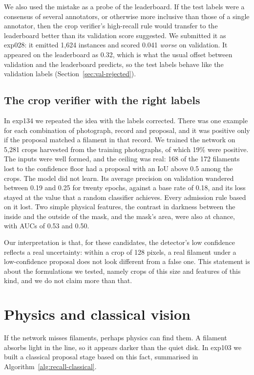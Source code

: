 We also used the mistake as a probe of the leaderboard. If the test labels were a consensus of several
annotators, or otherwise more inclusive than those of a single annotator, then the crop verifier's
high-recall rule would transfer to the leaderboard better than its validation score suggested. We
submitted it as exp028: it emitted 1,624 instances and scored 0.041 \emph{worse} on validation. It
appeared on the leaderboard as 0.32, which is what the usual offset between validation and the
leaderboard predicts, so the test labels behave like the validation labels
(Section~\ref{sec:val-rejected}).

\subsection{The crop verifier with the right labels}\label{sec:recall-crop-fixed}
In exp134 we repeated the idea with the labels corrected. There was one example for each combination
of photograph, record and proposal, and it was positive only if the proposal matched a filament in
that record. We trained the network on 5,281 crops harvested from the training photographs, of which
19\% were positive. The inputs were well formed, and the ceiling was real: 168 of the 172 filaments
lost to the confidence floor had a proposal with an IoU above 0.5 among the crops. The model did not
learn. Its average precision on validation wandered between 0.19 and 0.25 for twenty epochs, against a
base rate of 0.18, and its loss stayed at the value that a random classifier achieves. Every admission
rule based on it lost. Two simple physical features, the contrast in darkness between the inside and
the outside of the mask, and the mask's area, were also at chance, with AUCs of 0.53 and 0.50.

Our interpretation is that, for these candidates, the detector's low confidence reflects a real
uncertainty: within a crop of 128 pixels, a real filament under a low-confidence proposal does not
look different from a false one. This statement is about the formulations we tested, namely crops of
this size and features of this kind, and we do not claim more than that.

\section{Physics and classical vision}\label{sec:recall-physics}
If the network misses filaments, perhaps physics can find them. A filament absorbs light in the \Ha{}
line, so it appears darker than the quiet disk. In exp103 we built a classical proposal stage based on
this fact, summarised in Algorithm~\ref{alg:recall-classical}.

